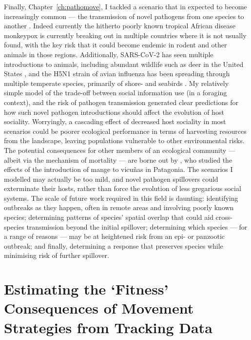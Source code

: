 Finally, Chapter~\ref{ch:pathomove}, I tackled a scenario that in expected to become increasingly common --- the transmission of novel pathogens from one species to another \citep{carlson2022a}.
Indeed currently the hitherto poorly known tropical African disease monkeypox is currently breaking out in multiple countries where it is not usually found, with the key risk that it could become endemic in rodent and other animals in those regions.
Additionally, SARS-CoV-2 has seen multiple introductions to animals, including abundant wildlife such as deer in the United States \citep{kuchipudi2022}, and the H5N1 strain of avian influenza has been spreading through multiple temperate species, primarily of shore- and seabirds \citep{wille2022}.
My relatively simple model of the trade-off between social information use (in a foraging context), and the risk of pathogen transmission generated clear predictions for how such novel pathogen introductions should affect the evolution of host sociality.
Worryingly, a cascading effect of decreased host sociality in most scenarios could be poorer ecological performance in terms of harvesting resources from the landscape, leaving populations vulnerable to other environmental risks.
The potential consequences for other members of an ecological community --- albeit via the mechanism of mortality --- are borne out by \citet{monk2022}, who studied the effects of the introduction of mange to vicu\~{n}as in Patagonia.
The scenarios I modelled may actually be too mild, and novel pathogen spillovers could exterminate their hosts, rather than force the evolution of less gregarious social systems.
The scale of future work required in this field is daunting: identifying outbreaks as they happen, often in remote areas and involving poorly known species; determining patterns of species' spatial overlap that could aid cross-species transmission beyond the initial spillover; determining which species --- for a range of reasons --- may be at heightened risk from an epi- or panzootic outbreak; and finally, determining a response that preserves species while minimising risk of further spillover.

\section*{Estimating the `Fitness' Consequences of Movement Strategies from Tracking Data}

